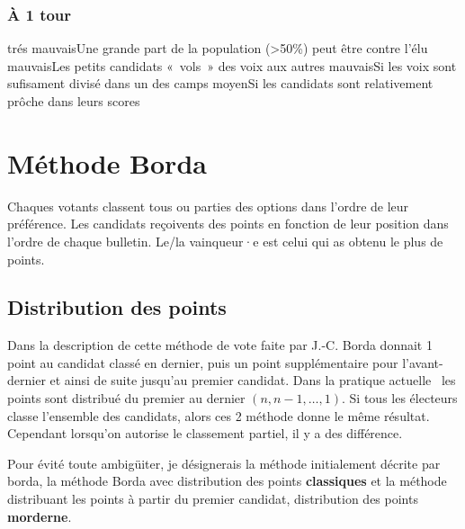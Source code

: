 \documentclass[../report]{subfiles}
\begin{document}
  \subsubsection{À 1 tour}
  \tabcritere%
    {trés mauvais}{Une grande part de la population (>50\%) peut être contre l'élu}%
    {mauvais}{Les petits candidats «~vols~» des voix aux autres}%
    {mauvais}{Si les voix sont sufisament divisé dans un des camps}%
    {moyen}{Si les candidats sont relativement prôche dans leurs scores}

  \section{Méthode Borda}
  
  Chaques votants classent tous ou parties des options dans l'ordre de leur préférence.
  Les candidats reçoivents des points en fonction de leur position dans l'ordre de chaque bulletin.
  Le/la vainqueur·e est celui qui as obtenu le plus de points.

  \subsection{Distribution des points}

  Dans la description de cette méthode de vote faite par J.-C. Borda donnait 1 point au
  candidat classé en dernier, puis un point supplémentaire pour l'avant-dernier et ainsi
  de suite jusqu'au premier candidat.
  Dans la pratique actuelle~\cite{emerson_original_2013} les points sont distribué du 
  premier au dernier $(n, n-1, …, 1)$.
  Si tous les électeurs classe l'ensemble des candidats, alors ces 2 méthode donne le même 
  résultat. Cependant lorsqu'on autorise le classement partiel, il y a des différence.

  Pour évité toute ambigüiter, je désignerais la méthode initialement décrite par borda, 
  la méthode Borda avec distribution des points \textbf{classiques} et la méthode distribuant
  les points à partir du premier candidat, distribution des points \textbf{morderne}.
\end{document}
